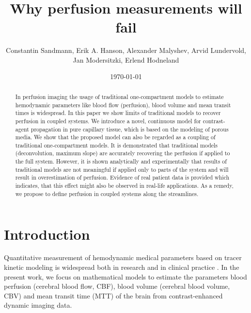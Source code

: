 \documentclass[journal,twocolumn]{IEEEtran}
\title{Why perfusion measurements will fail}
\author{Constantin Sandmann, Erik A. Hanson, Alexander Malyshev,  Arvid Lundervold, Jan Modersitzki, Erlend Hodneland }
\date{\today}
\begin{document}
	\maketitle

	\begin{abstract}
		In perfusion imaging the usage of traditional one-compartment models to estimate hemodynamic parameters like blood flow (perfusion), blood volume and mean transit times is widespread.
		In this paper we show limits of traditional models to recover perfusion in coupled systems.
		We introduce a novel, continuous model for contrast-agent propagation in pure capillary tissue, which is based on the modeling of porous media.
		We show that the proposed model can also be regarded as a coupling of traditional one-compartment models.
		It is demonstrated that traditional models (deconvolution, maximum slope) are accurately recovering the perfusion if applied to the full system.
		However, it is shown analytically and experimentally that results of traditional models are not meaningful if applied only to parts of the system and will result in overestimation of perfusion.
		Evidence of real patient data is provided which indicates, that this effect might also be observed in real-life applications.
		As a remedy, we propose to define perfusion in coupled systems along the streamlines.
	\end{abstract}

	\section{Introduction}
	
	Quantitative measurement of hemodynamic medical parameters based on tracer kinetic modeling is widespread both in research and in clinical practice \cite{sourbron13,zierler00,sourbron13}. 
	In the present work, we focus on mathematical models to estimate the parameters blood perfusion (cerebral blood flow, CBF), blood volume (cerebral blood volume, CBV) and mean transit time (MTT) of the brain from contrast-enhanced dynamic imaging data. 
\end{document}
